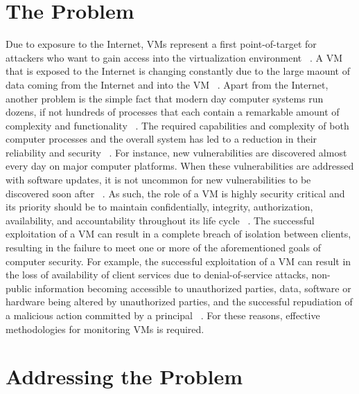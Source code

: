\documentclass{report}
\begin{document}
\begin{spacing}{1.5}
\section{The Problem}

{\large 
Due to exposure to the Internet, VMs represent a first point-of-target for attackers who want to gain access into the virtualization environment ~\cite{win2014virtual}. A VM that is exposed to the Internet is changing constantly due to the large maount of data coming from the Internet and into the VM ~\cite{somayaji2002operating}. Apart from the Internet, another problem is the simple fact that modern day computer systems run dozens, if not hundreds of processes that each contain a remarkable amount of complexity and functionality ~\cite{somayaji2002operating}. The required capabilities and complexity of both computer processes and the overall system has led to a reduction in their reliability and security ~\cite{somayaji2002operating}. For instance, new vulnerabilities are discovered almost every day on major computer platforms. When these vulnerabilities are addressed with software updates, it is not uncommon for new vulnerabilities to be discovered soon after ~\cite{somayaji2002operating}. As such, the role of a VM is highly security critical and its priority should be to maintain confidentially, integrity, authorization, availability, and accountability throughout its life cycle ~\cite{van2021computer}. The successful exploitation of a VM can result in a complete breach of isolation between clients, resulting in the failure to meet one or more of the aforementioned goals of computer security. For example, the successful exploitation of a VM can result in the loss of availability of client services due to denial-of-service attacks, non-public information becoming accessible to unauthorized parties, data, software or hardware being altered by unauthorized parties, and the successful repudiation of a malicious action committed by a principal ~\cite{van2021computer}. For these reasons, effective methodologies for monitoring VMs is required.
\newline
}

\section{Addressing the Problem}


\end{spacing}
\end{document}
